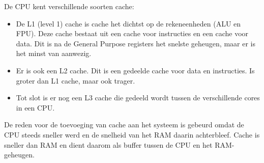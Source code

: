 De CPU kent verschillende soorten cache:
\begin{itemize}
\item De L1 (level 1) cache is cache het dichtst op de rekeneenheden (ALU en FPU). Deze cache bestaat uit een cache voor instructies en een cache voor data. Dit is na de General Purpose registers het snelste geheugen, maar er is het minst van aanwezig.
\item Er is ook een L2 cache. Dit is een gedeelde cache voor data en instructies. Is groter dan L1 cache, maar ook trager.
\item Tot slot is er nog een L3 cache die gedeeld wordt tussen de verschillende cores in een CPU.
\end{itemize}

De reden voor de toevoeging van cache aan het systeem is gebeurd omdat de CPU steeds sneller werd en de snelheid van het RAM daarin achterbleef. Cache is sneller dan RAM en dient daarom als buffer tussen de CPU en het RAM-geheugen.

